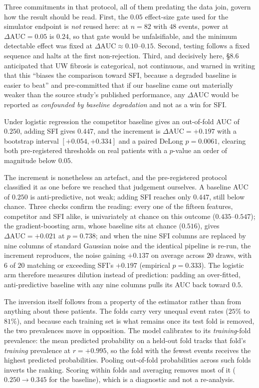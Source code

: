 \documentclass[11pt]{article}
\theoremstyle{definition}
\newcommand{\dAUC}{\Delta\mathrm{AUC}}
\begin{document}
Three commitments in that protocol, all of them predating the data join, govern
how the result should be read. First, the $0.05$ effect-size gate used for the
simulator endpoint is \emph{not} reused here: at $n=82$ with $48$ events, power at
$\dAUC=0.05$ is $0.24$, so that gate would be unfalsifiable, and the minimum
detectable effect was fixed at $\dAUC\approx0.10$--$0.15$. Second, testing follows
a fixed sequence and halts at the first non-rejection. Third, and decisively here,
\S8.6 anticipated that UW fibrosis is categorical, not continuous, and warned
in writing that this ``biases the comparison toward SFI, because a degraded
baseline is easier to beat'' and pre-committed that if our baseline came out
materially weaker than the source study's published performance, any $\dAUC$ would
be reported as \emph{confounded by baseline degradation} and not as a win for
SFI.

Under logistic regression the competitor baseline gives an out-of-fold AUC of
$0.250$, adding SFI gives $0.447$, and the increment is $\dAUC=+0.197$ with a
bootstrap interval $[+0.054,+0.334]$ and a paired DeLong $p=0.0061$, clearing both
pre-registered thresholds on real patients with a $p$-value an order of magnitude
below $0.05$.

The increment is nonetheless an artefact, and the pre-registered protocol
classified it as one before we reached that judgement ourselves. A baseline AUC of
$0.250$ is anti-predictive, not weak; adding SFI reaches only $0.447$, still
below chance. Three checks confirm the reading: every one of the fifteen
features, competitor and SFI alike, is univariately at chance on this outcome
($0.435$--$0.547$); the gradient-boosting arm, whose baseline sits at chance
($0.516$), gives $\dAUC=+0.021$ at $p=0.738$; and when the nine SFI columns are
replaced by nine columns of standard Gaussian noise and the identical pipeline is
re-run, the increment reproduces, the noise gaining $+0.137$ on average across
$20$ draws, with $6$ of $20$ matching or exceeding SFI's $+0.197$ (empirical
$p=0.333$). The logistic arm therefore measures dilution instead of prediction:
padding an over-fitted, anti-predictive baseline with any nine columns pulls its
AUC back toward $0.5$.

The inversion itself follows from a property of the estimator rather than from
anything about these patients. The folds carry very unequal event rates ($25\%$ to
$81\%$), and because each training set is what remains once its test fold is
removed, the two prevalences move in opposition. The model calibrates to its
\emph{training}-fold prevalence: the mean predicted probability on a held-out fold
tracks that fold's \emph{training} prevalence at $r=+0.995$, so the fold with the
fewest events receives the highest predicted probabilities. Pooling out-of-fold probabilities across such folds inverts the
ranking. Scoring within folds and averaging removes most of it ($0.250\to0.345$
for the baseline), which is a diagnostic and not a re-analysis.
\end{document}
